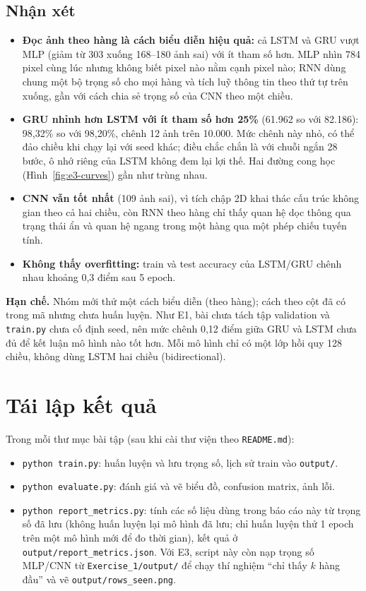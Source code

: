 \documentclass[12pt]{article}
\newcommand{\code}[1]{\texttt{#1}}
\newcommand{\st}[1]{\textbf{#1}}
\begin{document}
\subsection{Nhận xét}
\begin{itemize}
  \item \st{Đọc ảnh theo hàng là cách biểu diễn hiệu quả:} cả LSTM và GRU vượt MLP (giảm từ 303 xuống 168--180 ảnh sai) với
        ít tham số hơn. MLP nhìn 784 pixel cùng lúc nhưng không biết pixel nào nằm cạnh pixel nào; RNN dùng chung một bộ trọng
        số cho mọi hàng và tích luỹ thông tin theo thứ tự trên xuống, gần với cách chia sẻ trọng số của CNN theo một chiều.
  \item \st{GRU nhỉnh hơn LSTM với ít tham số hơn 25\%} (61.962 so với 82.186): 98,32\% so với 98,20\%, chênh 12 ảnh trên 10.000.
        Mức chênh này nhỏ, có thể đảo chiều khi chạy lại với seed khác; điều chắc chắn là với chuỗi ngắn 28 bước, ô nhớ riêng
        của LSTM không đem lại lợi thế. Hai đường cong học (Hình~\ref{fig:e3-curves}) gần như trùng nhau.
  \item \st{CNN vẫn tốt nhất} (109 ảnh sai), vì tích chập 2D khai thác cấu trúc không gian theo cả hai chiều, còn RNN theo hàng
        chỉ thấy quan hệ dọc thông qua trạng thái ẩn và quan hệ ngang trong một hàng qua một phép chiếu tuyến tính.
  \item \st{Không thấy overfitting:} train và test accuracy của LSTM/GRU chênh nhau khoảng 0,3 điểm sau 5 epoch.
\end{itemize}

\textbf{Hạn chế.} Nhóm mới thử một cách biểu diễn (theo hàng); cách theo cột đã có trong mã nhưng chưa huấn luyện. Như E1,
bài chưa tách tập validation và \code{train.py} chưa cố định seed, nên mức chênh 0,12 điểm giữa GRU và LSTM chưa đủ để kết
luận mô hình nào tốt hơn. Mỗi mô hình chỉ có một lớp hồi quy 128 chiều, không dùng LSTM hai chiều (bidirectional).

\section{Tái lập kết quả}
Trong mỗi thư mục bài tập (sau khi cài thư viện theo \code{README.md}):
\begin{itemize}
  \item \code{python train.py}: huấn luyện và lưu trọng số, lịch sử train vào \code{output/}.
  \item \code{python evaluate.py}: đánh giá và vẽ biểu đồ, confusion matrix, ảnh lỗi.
  \item \code{python report\_metrics.py}: tính các số liệu dùng trong báo cáo này từ trọng số đã lưu (không huấn luyện lại
        mô hình đã lưu; chỉ huấn luyện thử 1 epoch trên một mô hình mới để đo thời gian), kết quả ở
        \code{output/report\_metrics.json}. Với E3, script này còn nạp trọng số MLP/CNN từ \code{Exercise\_1/output/} để
        chạy thí nghiệm ``chỉ thấy $k$ hàng đầu'' và vẽ \code{output/rows\_seen.png}.
\end{itemize}
\end{document}
